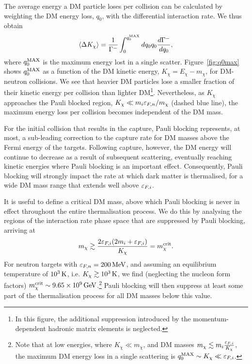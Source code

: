 The average energy a DM particle loses per collision can be calculated by weighting the DM energy loss, $q_0$, with the differential interaction rate. We thus obtain
\begin{equation}
  \langle \Delta K_\chi\rangle = \frac{1}{\Gamma^{-}} \int_{0}^{q_0^{\rm MAX}} dq_0 q_0  \frac{d\Gamma^-}{dq_0}, 
\end{equation}
where $q_0^{\rm MAX}$ is the maximum energy lost in a single scatter. 
Figure~\ref{fig:q0max} shows $q_0^{\rm MAX}$ as a function of the DM kinetic energy, $K_\chi=E_\chi-m_\chi$, for DM-neutron collisions. We see that heavier DM particles lose a smaller fraction of their kinetic energy per collision than lighter DM\footnote{In this figure, the additional suppression introduced by the momentum-dependent hadronic matrix elements is neglected.}.  
Nevertheless, as $K_\chi$ approaches the Pauli blocked region, $K_\chi \ll m_i \varepsilon_{F,n}/m_\chi$ (dashed blue line), the maximum energy loss per collision becomes independent of the DM mass. 


For the initial collision that results in the capture, Pauli blocking represents, at most, a sub-leading correction to the capture rate for DM masses above the Fermi energy of the targets. 
Following capture, however, the DM energy will continue to decrease as a result of subsequent scattering, eventually reaching kinetic energies where Pauli blocking is an important effect. Consequently, Pauli blocking will strongly impact the rate at which dark matter is thermalised, for a wide DM mass range that extends well above $\varepsilon_{F,i}$.  


It is useful to define a critical DM mass, above which Pauli blocking is never in effect throughout the entire thermalisation process. We do this by analysing the regions of the interaction rate phase space that are suppressed by Pauli blocking, arriving at
\begin{equation}
  m_\chi \gtrsim \frac{2\varepsilon_{F,i}(2 m_i + \varepsilon_{F,i})}{K_\chi} =m_\chi^{\rm crit}. 
  \label{eq:mucrit}
\end{equation}
For neutron targets with $\varepsilon_{F,n}=200{\rm \,MeV}$, and assuming an equilibrium temperature of $10^3{\rm \,K}$, i.e. $K_\chi \gtrsim 10^3 {\rm \,K}$, we find (neglecting the nucleon form factors) $m_\chi^{\rm crit} \sim 9.65\times 10^9{\rm \,GeV}$.\footnote{Note that at low energies, where $K_\chi \ll m_\chi$, and DM masses  $m_\chi\lesssim m_i \frac{\varepsilon_{F,i}}{K_\chi}$,  the maximum DM energy loss in a single scattering is $q_0^{\rm MAX}\sim K_\chi\ll\varepsilon_{F,i}$.} 
Pauli blocking will then suppress at least some part of the thermalisation process for all DM masses below this value. 


